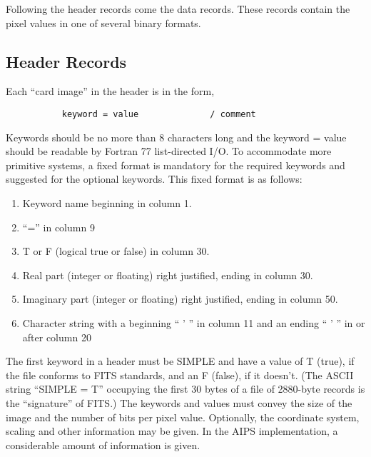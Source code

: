 Following the header records come the data records.  These records
contain the pixel values in one of several binary formats.

\subsection{Header Records }
Each ``card image'' in the header is in the form,

\begin{verbatim}
           keyword = value              / comment

\end{verbatim}
Keywords should be no more than 8 characters long and the keyword =
value should be readable by Fortran 77 list-directed I/O. To
accommodate more primitive systems, a fixed format is mandatory for
the required keywords and suggested for the optional keywords.  This
fixed format is as follows:
\begin{enumerate} %
\item Keyword name beginning in column 1.
\item ``='' in column 9
\item T or F (logical true or false) in column 30.
\item Real part (integer or floating) right justified, ending in column 30.
\item Imaginary part (integer or floating) right justified, ending in column
50.
\item Character string with a beginning `` ' '' in column 11 and an
ending `` ' '' in or after column 20

\end{enumerate} %
The first keyword in a header must be SIMPLE and have a value of T
(true), if the file conforms to FITS standards, and an F (false), if
it doesn't. (The ASCII string ``SIMPLE = T'' occupying the first 30
bytes of a file of 2880-byte records is the ``signature'' of FITS.) The
keywords and values must convey the size of the image and the number
of bits per pixel value.  Optionally, the coordinate system, scaling
and other information may be given.  In the AIPS implementation, a
considerable amount of information is given.

